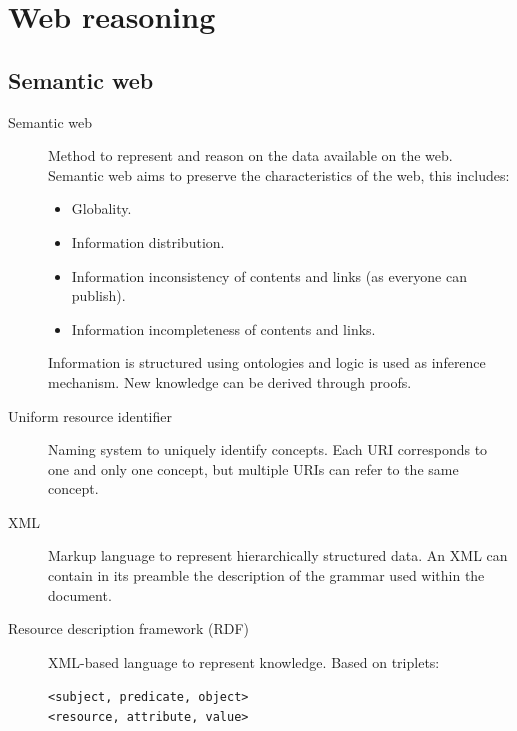 \chapter{Web reasoning}


\section{Semantic web}

\begin{description}
    \item[Semantic web] 
        Method to represent and reason on the data available on the web.
        Semantic web aims to preserve the characteristics of the web, this includes:
        \begin{itemize}
            \item Globality.
            \item Information distribution.
            \item Information inconsistency of contents and links (as everyone can publish).
            \item Information incompleteness of contents and links.
        \end{itemize}

        Information is structured using ontologies and logic is used as inference mechanism.
        New knowledge can be derived through proofs.

    \item[Uniform resource identifier] 
        Naming system to uniquely identify concepts.
        Each URI corresponds to one and only one concept, but multiple URIs can refer to the same concept.

    \item[XML] 
        Markup language to represent hierarchically structured data.
        An XML can contain in its preamble the description of the grammar used within the document.

    \item[Resource description framework (RDF)] 
        XML-based language to represent knowledge.
        Based on triplets:
        \begin{center}
            \texttt{<subject, predicate, object>}\\
            \texttt{<resource, attribute, value>}
        \end{center}


\end{description}
